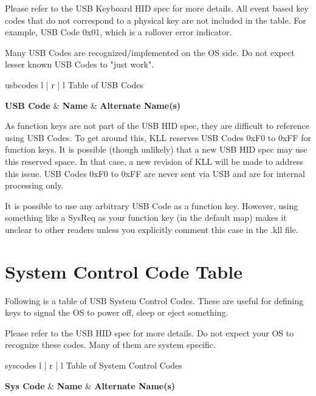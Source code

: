 \documentclass{kiibohd-template}
\begin{document}
Please refer to the USB Keyboard HID spec for more details.
All event based key codes that do not correspond to a physical key are not included in the table.
For example, USB Code 0x01, which is a rollover error indicator.

Many USB Codes are recognized/implemented on the OS side.
Do not expect lesser known USB Codes to "just work".

\begin{ltable}{usbcodes}{ l | r | l }{Table of USB Codes}

\textbf{USB Code} & \textbf{Name} & \textbf{Alternate Name(s)} \\
\hline
\hline


\end{ltable}

As function keys are not part of the USB HID spec, they are difficult to reference using USB Codes.
To get around this, KLL reserves USB Codes 0xF0 to 0xFF for function keys.
It is possible (though unlikely) that a new USB HID spec may use this reserved space.
In that case, a new revision of KLL will be made to address this issue.
USB Codes 0xF0 to 0xFF are never sent via USB and are for internal processing only.

It is possible to use any arbitrary USB Code as a function key.
However, using something like a SysReq as your function key (in the default map) makes it unclear to other readers unless you explicitly comment this case in the .kll file.


\newpage
\chapter{System Control Code Table}
\label{chpt:SysCodeTable}

Following is a table of USB System Control Codes.
These are useful for defining keys to signal the OS to power off, sleep or eject something.

Please refer to the USB HID spec for more details.
Do not expect your OS to recognize these codes.
Many of them are system specific.

\begin{ltable}{syscodes}{ l | r | l }{Table of System Control Codes}

\textbf{Sys Code} & \textbf{Name} & \textbf{Alternate Name(s)} \\
\hline
\hline


\end{ltable}
\end{document}
